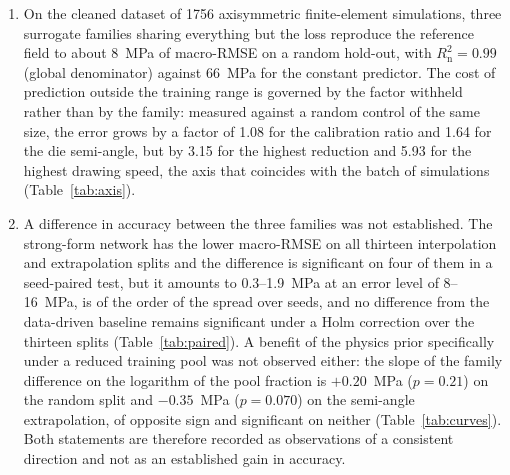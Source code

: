 \documentclass[subscriptcorrection,upint,varvw,barcolor=Goldenrod3,mathalfa=cal=euler,balance,hyphenate,french,pdf-a]{asmejour} %
\begin{document}
\begin{enumerate}

\item On the cleaned dataset of 1756 axisymmetric finite-element simulations, three surrogate families sharing everything but the loss reproduce the reference field to about 8~MPa of macro-RMSE on a random hold-out, with $R^2_{\mathrm{n}} = 0.99$ (global denominator) against 66~MPa for the constant predictor. The cost of prediction outside the training range is governed by the factor withheld rather than by the family: measured against a random control of the same size, the error grows by a factor of 1.08 for the calibration ratio and 1.64 for the die semi-angle, but by 3.15 for the highest reduction and 5.93 for the highest drawing speed, the axis that coincides with the batch of simulations (Table~\ref{tab:axis}).

\item A difference in accuracy between the three families was not established. The strong-form network has the lower macro-RMSE on all thirteen interpolation and extrapolation splits and the difference is significant on four of them in a seed-paired test, but it amounts to 0.3--1.9~MPa at an error level of 8--16~MPa, is of the order of the spread over seeds, and no difference from the data-driven baseline remains significant under a Holm correction over the thirteen splits (Table~\ref{tab:paired}). A benefit of the physics prior specifically under a reduced training pool was not observed either: the slope of the family difference on the logarithm of the pool fraction is $+0.20$~MPa ($p=0.21$) on the random split and $-0.35$~MPa ($p=0.070$) on the semi-angle extrapolation, of opposite sign and significant on neither (Table~\ref{tab:curves}). Both statements are therefore recorded as observations of a consistent direction and not as an established gain in accuracy. %


\end{enumerate}
\end{document}

